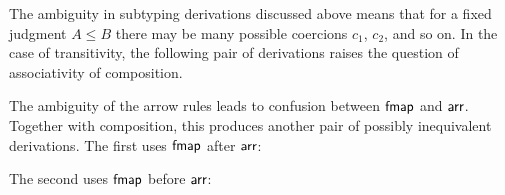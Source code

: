 \documentclass[acmsmall,screen]{acmart}
\begin{document}
The ambiguity in subtyping derivations discussed above means that for a fixed
judgment \(A \leq B\) there may be many possible coercions \(c_1\), \(c_2\), and
so on. In the case of transitivity, the following pair of derivations
raises the question of associativity of composition.
  \begin{mathpar}

  \end{mathpar}
The ambiguity of the arrow rules leads to confusion between \(\mathsf{fmap}\) and
\(\mathsf{arr}\). Together with composition, this produces another pair of possibly
inequivalent derivations.
\clearpage
The first uses \(\mathsf{fmap}\) after \(\mathsf{arr}\):
\begin{mathpar}
\end{mathpar}

The second uses \(\mathsf{fmap}\) before \(\mathsf{arr}\):
\begin{mathpar}
\end{mathpar}
\end{document}
